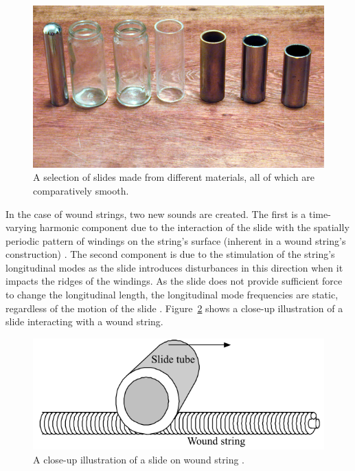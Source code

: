 \documentclass[../main.tex]{subfiles}
\begin{document}
\begin{figure}[h]
    \centering
    \includegraphics[scale=.35]{./images/pictures/Slide-guitar-different-slides-768x427.jpg}
    \caption{A selection of slides made from different materials, all of which are comparatively smooth.}
    \label{fig:slide_types}
\end{figure}

In the case of wound strings, two new sounds are created. The first is a time-varying harmonic component due to the interaction of the slide with the spatially periodic pattern of windings on the string’s surface (inherent in a wound string’s construction) . The second component is due to the stimulation of the string’s longitudinal modes as the slide introduces disturbances in this direction when it impacts the ridges of the windings. As the slide does not provide sufficient force to change the longitudinal length, the longitudinal mode frequencies are static, regardless of the motion of the slide . Figure~\ref{fig:slide_string_zoom} shows a close-up illustration of a slide interacting with a wound string.

\begin{figure}[h]
    \centering
    \includegraphics[scale=1]{./images/pictures/slide_wound_string_zoom.PNG}
    \caption{A close-up illustration of a slide on wound string .}
    \label{fig:slide_string_zoom}
\end{figure}
\end{document}
